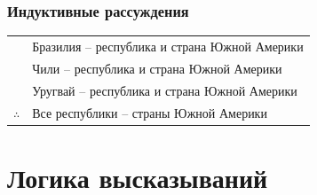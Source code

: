 \documentclass[24pt,pdf,hyperref={unicode},aspectratio=169]{beamer}
\begin{document}
\begin{frame}\frametitle{Индуктивные рассуждения}
\begin{tabular}{l l}
 & Бразилия -- республика и страна Южной Америки \\
 & Чили -- республика и страна Южной Америки \\
 & Уругвай -- республика и страна Южной Америки \\
\hline
$\therefore$ & Все республики -- страны Южной Америки\\
\end{tabular}
\begin{flushright}
\end{flushright}
\end{frame}


\section{Логика высказываний}
\end{document}
